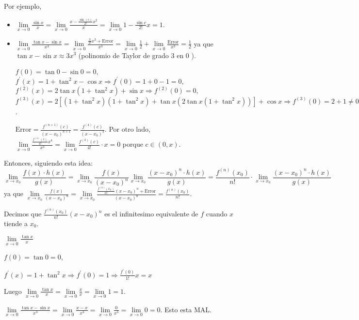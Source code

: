 Por ejemplo,
\begin{itemize}
	\item \(\lim\limits_{x  \to 0 } \frac{\sin x }{x }= \lim\limits_{x  \to 0 } \frac{x - \frac{\sin (c )}{2! }x^{2} }{x} = \lim\limits_{x  \to 0 } 1 - \frac{\sin c }{2! }x = 1\).
	\item \(\lim\limits_{x  \to 0 } \frac{\tan x - \sin x }{x^{3} } = \lim\limits_{x  \to 0 } \frac{\frac{3}{3!}x^{3} + \text{Error}  }{x^{3} } = \lim\limits_{x  \to 0 } \frac{1}{2} + \lim\limits_{x  \to 0 } \frac{\text{Error}  }{x^{3} } = \frac{1}{2}\) ya que \(\tan x - \sin x \approx 3x^{3 } \) (polinomio de Taylor de grado \(3 \) en \(0 \) ).
	      
	      \(f(0) = \tan 0 - \sin 0 = 0 \), \(f^\prime (x) = 1 + \tan^{2}x - \cos x \Rightarrow f^\prime (0) = 1 + 0 -1 = 0 \), \(f^{(2)}(x) = 2 \tan x (1 + \tan^{2} x ) + \sin x \Rightarrow f^{(2)}(0) = 0  \), \(f^{(3)}(x) = 2[(1 + \tan^{2}x )(1 + \tan^{2}x ) + \tan x (2\tan x (1 + \tan^{2} x))] + \cos x \Rightarrow f^{(3)}(0) = 2 + 1 \neq 0 \).
	      
	      \(\text{Error}  = \frac{f^{(n + 1)}(c) }{(x - x_0)^{n + 1} } = \frac{f^{(4)}(c) }{(x - x_0)^{4} }\). Por otro lado,  \(\lim\limits_{x  \to 0 } \frac{\frac{f^{(4)}(c) }{4!}x^{4} }{x^{3} } = \lim\limits_{x \to 0} \frac{f^{(4)}(c)}{4!} \cdot x = 0\) porque \(c \in (0,x)\).  
\end{itemize}
Entonces, siguiendo esta idea:
\[
	\lim\limits_{x  \to x_0 } \frac{f(x) \cdot h(x)}{g(x)} = \lim\limits_{x  \to x_0 } \frac{f(x)}{(x - x_0)^{n} } \lim\limits_{x  \to x_0 } \frac{(x - x_0)^{n} \cdot h(x) }{g(x)} = \frac{f^{(n)}(x_0) }{n!} \cdot \lim\limits_{x  \to x_0 } \frac{(x - x_0)^{n} \cdot h(x) }{g(x)}
\]
ya que \(\lim\limits_{x  \to x_0 } \frac{f(x )}{(x - x_0)^{n} } = \lim\limits_{x  \to x_0 } \frac{\frac{f^{(n)}(x_0) }{n!}(x - x_0)^{n} + \text{Error} }{(x - x_0)^{n} } = \frac{f^{(n)}(x_0) }{n!}\).

Decimos que \(\frac{f^{(n)}(x_0) }{n!}(x - x_0)^{n} \) es el infinitesimo equivalente de \(f \) cuando \(x \) tiende a \(x_0 \).

\begin{example}
	\(\lim\limits_{x \to 0} \frac{\tan x }{x } \)
	
	\(f(0) = \tan 0 = 0 \),
	
	\(f^\prime (x) = 1 + \tan^{2}x \Rightarrow f^\prime (0) = 1 \Rightarrow \frac{f^\prime (0)}{1!} x = x \)
	
	Luego \(\lim\limits_{x \to 0} \frac{\tan x }{x } = \lim\limits_{x  \to 0 } \frac{x }{x } = \lim\limits_{x  \to 0 } 1 = 1 \).
\end{example}
\begin{example}
	\(\lim\limits_{x  \to 0 } \frac{\tan x - \sin x }{x^{3} } = \lim\limits_{x  \to 0 } \frac{x - x }{x^{3} } = \lim\limits_{x  \to 0 } \frac{0 }{x^{3} } = \lim\limits_{x  \to 0 } 0 = 0 \). Esto esta MAL.
\end{example}

